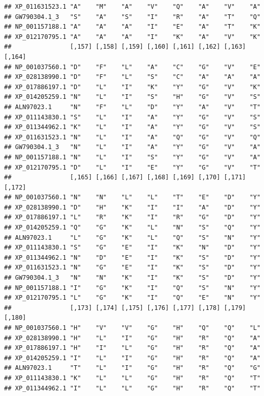 \documentclass[]{article}
\begin{document}
\begin{verbatim}
## XP_011631523.1 "A"    "M"    "A"    "V"    "Q"    "A"    "V"    "A"   
## GW790304.1_3   "S"    "A"    "S"    "I"    "R"    "A"    "T"    "Q"   
## NP_001157188.1 "A"    "A"    "A"    "I"    "E"    "A"    "T"    "K"   
## XP_012170795.1 "A"    "A"    "A"    "I"    "K"    "A"    "V"    "K"   
##                [,157] [,158] [,159] [,160] [,161] [,162] [,163] [,164]
## NP_001037560.1 "D"    "F"    "L"    "A"    "C"    "G"    "V"    "E"   
## XP_028138990.1 "D"    "F"    "L"    "S"    "C"    "A"    "A"    "A"   
## XP_017886197.1 "D"    "L"    "I"    "K"    "Y"    "G"    "V"    "K"   
## XP_014205259.1 "N"    "L"    "I"    "S"    "H"    "G"    "V"    "S"   
## ALN97023.1     "N"    "F"    "L"    "D"    "Y"    "A"    "V"    "T"   
## XP_011143830.1 "S"    "L"    "I"    "A"    "Y"    "G"    "V"    "S"   
## XP_011344962.1 "K"    "L"    "I"    "A"    "Y"    "G"    "V"    "S"   
## XP_011631523.1 "N"    "L"    "I"    "A"    "Q"    "G"    "V"    "Q"   
## GW790304.1_3   "N"    "L"    "I"    "A"    "Y"    "G"    "V"    "A"   
## NP_001157188.1 "N"    "L"    "I"    "S"    "Y"    "G"    "V"    "A"   
## XP_012170795.1 "D"    "L"    "I"    "E"    "Y"    "G"    "V"    "T"   
##                [,165] [,166] [,167] [,168] [,169] [,170] [,171] [,172]
## NP_001037560.1 "N"    "N"    "L"    "L"    "T"    "E"    "D"    "Y"   
## XP_028138990.1 "D"    "H"    "K"    "I"    "I"    "A"    "D"    "Y"   
## XP_017886197.1 "L"    "R"    "K"    "I"    "R"    "G"    "D"    "Y"   
## XP_014205259.1 "Q"    "G"    "K"    "L"    "N"    "S"    "Q"    "Y"   
## ALN97023.1     "L"    "G"    "K"    "L"    "Q"    "S"    "N"    "Y"   
## XP_011143830.1 "S"    "G"    "E"    "I"    "K"    "N"    "D"    "Y"   
## XP_011344962.1 "N"    "D"    "E"    "I"    "K"    "S"    "D"    "Y"   
## XP_011631523.1 "N"    "G"    "E"    "I"    "K"    "S"    "D"    "Y"   
## GW790304.1_3   "N"    "N"    "K"    "I"    "K"    "S"    "D"    "Y"   
## NP_001157188.1 "I"    "G"    "K"    "I"    "Q"    "S"    "N"    "Y"   
## XP_012170795.1 "L"    "G"    "K"    "I"    "Q"    "E"    "N"    "Y"   
##                [,173] [,174] [,175] [,176] [,177] [,178] [,179] [,180]
## NP_001037560.1 "H"    "V"    "V"    "G"    "H"    "Q"    "Q"    "L"   
## XP_028138990.1 "H"    "L"    "I"    "G"    "H"    "R"    "Q"    "A"   
## XP_017886197.1 "H"    "I"    "L"    "G"    "H"    "R"    "Q"    "A"   
## XP_014205259.1 "I"    "L"    "I"    "G"    "H"    "R"    "Q"    "A"   
## ALN97023.1     "T"    "L"    "I"    "G"    "H"    "R"    "Q"    "G"   
## XP_011143830.1 "K"    "L"    "L"    "G"    "H"    "R"    "Q"    "T"   
## XP_011344962.1 "I"    "L"    "L"    "G"    "H"    "R"    "Q"    "T"   

\end{verbatim}
\end{document}
